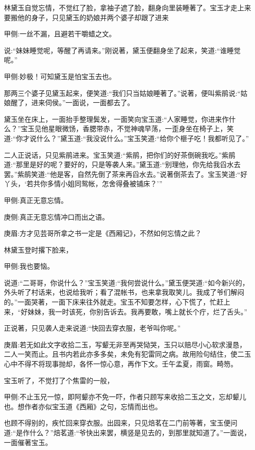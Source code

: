 \begin{parag}
    林黛玉自觉忘情，不觉红了脸，拿袖子遮了脸，翻身向里装睡著了。宝玉才走上来要搬他的身子，只见黛玉的奶娘并两个婆子却跟了进来\begin{note}甲侧:一丝不漏，且避若干嚼蜡之文。\end{note}说:“妹妹睡觉呢，等醒了再请来。”刚说著，黛玉便翻身坐了起来，笑道:“谁睡觉呢。”\begin{note}甲侧:妙极！可知黛玉是怕宝玉去也。\end{note}那两三个婆子见黛玉起来，便笑道:“我们只当姑娘睡著了。”说著，便叫紫鹃说:“姑娘醒了，进来伺侯。”一面说，一面都去了。
\end{parag}


\begin{parag}
    黛玉坐在床上，一面抬手整理鬓发，一面笑向宝玉道:“人家睡觉，你进来作什么？”宝玉见他星眼微饧，香腮带赤，不觉神魂早荡，一歪身坐在椅子上，笑道:“你才说什么？”黛玉道:“我没说什么。”宝玉笑道:“给你个榧子吃！我都听见了。”
\end{parag}


\begin{parag}
    二人正说话，只见紫鹃进来。宝玉笑道:“紫鹃，把你们的好茶倒碗我吃。”紫鹃道:“那里是好的呢？要好的，只是等袭人来。”黛玉道:“别理他，你先给我舀水去罢。”紫鹃笑道:“他是客，自然先倒了茶来再舀水去。”说著倒茶去了。宝玉笑道:“好丫头，‘若共你多情小姐同鸳帐，怎舍得叠被铺床？’”\begin{note}甲侧:真正无意忘情。\end{note}\begin{note}庚侧:真正无意忘情冲口而出之语。\end{note}\begin{note}庚眉:方才见芸哥所拿之书一定是《西厢记》，不然如何忘情之此？\end{note}林黛玉登时撂下脸来，\begin{note}甲侧:我也要恼。\end{note}说道:“二哥哥，你说什么？”宝玉笑道:“我何尝说什么。”黛玉便哭道:“如今新兴的，外头听了村话来，也说给我听；看了混帐书，也来拿我取笑儿。我成了爷们解闷的。”一面哭著，一面下床来往外就走。宝玉不知要怎样，心下慌了，忙赶上来，“好妹妹，我一时该死，你别告诉去。我再要敢，嘴上就长个疔，烂了舌头。”
\end{parag}


\begin{parag}
    正说著，只见袭人走来说道:“快回去穿衣服，老爷叫你呢。”\begin{note}庚眉:若无如此文字收拾二玉，写颦无非至再哭恸哭，玉只以赔尽小心软求漫恳，二人一笑而止。且书内若此亦多多矣，未免有犯雷同之病。故用险句结住，使二玉心中不得不将现事抛却，各怀一惊心意，再作下文。壬午孟夏，雨窗。畸笏。\end{note}宝玉听了，不觉打了个焦雷的一般，\begin{note}甲侧:不止玉兄一惊，即阿颦亦不免一吓，作者只顾写来收拾二玉之文，忘却颦儿也。想作者亦似宝玉道《西厢》之句，忘情而出也。\end{note}也顾不得别的，疾忙回来穿衣服。出园来，只见焙茗在二门前等著，宝玉便问道:“是作什么？”焙茗道:“爷快出来罢，横竖是见去的，到那里就知道了。”一面说，一面催著宝玉。
\end{parag}


